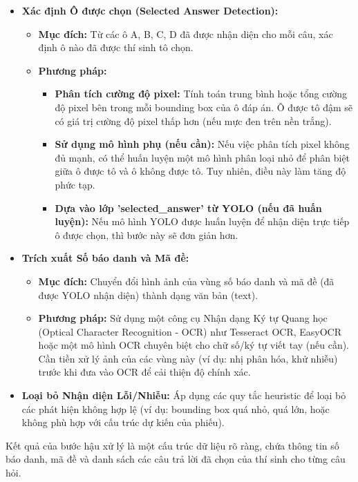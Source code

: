 \begin{itemize}
    \item \textbf{Xác định Ô được chọn (Selected Answer Detection):}
        \begin{itemize}
            \item \textbf{Mục đích:} Từ các ô A, B, C, D đã được nhận diện cho mỗi câu, xác định ô nào đã được thí sinh tô chọn.
            \item \textbf{Phương pháp:}
                \begin{itemize}
                    \item \textbf{Phân tích cường độ pixel:} Tính toán trung bình hoặc tổng cường độ pixel bên trong mỗi bounding box của ô đáp án. Ô được tô đậm sẽ có giá trị cường độ pixel thấp hơn (nếu mực đen trên nền trắng).
                    \item \textbf{Sử dụng mô hình phụ (nếu cần):} Nếu việc phân tích pixel không đủ mạnh, có thể huấn luyện một mô hình phân loại nhỏ để phân biệt giữa ô được tô và ô không được tô. Tuy nhiên, điều này làm tăng độ phức tạp.
                    \item \textbf{Dựa vào lớp 'selected\_answer' từ YOLO (nếu đã huấn luyện):} Nếu mô hình YOLO được huấn luyện để nhận diện trực tiếp ô được chọn, thì bước này sẽ đơn giản hơn.
                \end{itemize}
        \end{itemize}
    \item \textbf{Trích xuất Số báo danh và Mã đề:}
        \begin{itemize}
            \item \textbf{Mục đích:} Chuyển đổi hình ảnh của vùng số báo danh và mã đề (đã được YOLO nhận diện) thành dạng văn bản (text).
            \item \textbf{Phương pháp:} Sử dụng một công cụ Nhận dạng Ký tự Quang học (Optical Character Recognition - OCR) như Tesseract OCR, EasyOCR hoặc một mô hình OCR chuyên biệt cho chữ số/ký tự viết tay (nếu cần). Cần tiền xử lý ảnh của các vùng này (ví dụ: nhị phân hóa, khử nhiễu) trước khi đưa vào OCR để cải thiện độ chính xác.
        \end{itemize}
    \item \textbf{Loại bỏ Nhận diện Lỗi/Nhiễu:} Áp dụng các quy tắc heuristic để loại bỏ các phát hiện không hợp lệ (ví dụ: bounding box quá nhỏ, quá lớn, hoặc không phù hợp với cấu trúc dự kiến của phiếu).
\end{itemize}
Kết quả của bước hậu xử lý là một cấu trúc dữ liệu rõ ràng, chứa thông tin số báo danh, mã đề và danh sách các câu trả lời đã chọn của thí sinh cho từng câu hỏi.

